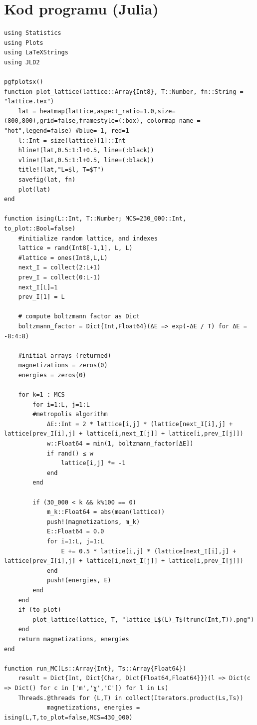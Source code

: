 \documentclass[11pt]{article}
\begin{document}
\section*{Kod programu (Julia)}
\begin{verbatim}
using Statistics
using Plots
using LaTeXStrings
using JLD2

pgfplotsx()
function plot_lattice(lattice::Array{Int8}, T::Number, fn::String = "lattice.tex")
    lat = heatmap(lattice,aspect_ratio=1.0,size=(800,800),grid=false,framestyle=(:box), colormap_name = "hot",legend=false) #blue=-1, red=1
    l::Int = size(lattice)[1]::Int
    hline!(lat,0.5:1:l+0.5, line=(:black))
    vline!(lat,0.5:1:l+0.5, line=(:black))
    title!(lat,"L=$l, T=$T")
    savefig(lat, fn)
    plot(lat)
end

function ising(L::Int, T::Number; MCS=230_000::Int, to_plot::Bool=false)
    #initialize random lattice, and indexes
    lattice = rand(Int8[-1,1], L, L)
    #lattice = ones(Int8,L,L)
    next_I = collect(2:L+1)
    prev_I = collect(0:L-1)
    next_I[L]=1 
    prev_I[1] = L
    
    # compute boltzmann factor as Dict
    boltzmann_factor = Dict{Int,Float64}(ΔE => exp(-ΔE / T) for ΔE = -8:4:8)

    #initial arrays (returned)
    magnetizations = zeros(0)
    energies = zeros(0)

    for k=1 : MCS
        for i=1:L, j=1:L
        #metropolis algorithm
            ΔE::Int = 2 * lattice[i,j] * (lattice[next_I[i],j] + lattice[prev_I[i],j] + lattice[i,next_I[j]] + lattice[i,prev_I[j]])
            w::Float64 = min(1, boltzmann_factor[ΔE])
            if rand() ≤ w
                lattice[i,j] *= -1
            end
        end

        if (30_000 < k && k%100 == 0)
            m_k::Float64 = abs(mean(lattice))
            push!(magnetizations, m_k)
            E::Float64 = 0.0
            for i=1:L, j=1:L
                E += 0.5 * lattice[i,j] * (lattice[next_I[i],j] + lattice[prev_I[i],j] + lattice[i,next_I[j]] + lattice[i,prev_I[j]])
            end
            push!(energies, E)
        end
    end
    if (to_plot)
        plot_lattice(lattice, T, "lattice_L$(L)_T$(trunc(Int,T)).png")
    end
    return magnetizations, energies
end

function run_MC(Ls::Array{Int}, Ts::Array{Float64})
    result = Dict{Int, Dict{Char, Dict{Float64,Float64}}}(l => Dict(c => Dict() for c in ['m','χ','C']) for l in Ls)
    Threads.@threads for (L,T) in collect(Iterators.product(Ls,Ts))
            magnetizations, energies = ising(L,T,to_plot=false,MCS=430_000)


\end{verbatim}
\end{document}
